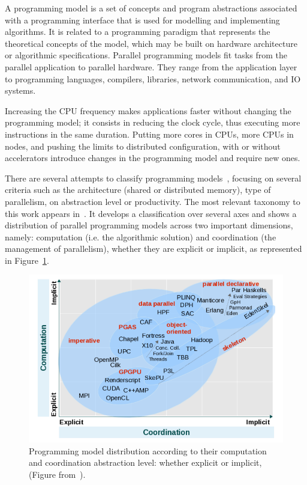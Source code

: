 A programming model is a set of concepts and program abstractions associated with a programming interface that is used for modelling and implementing algorithms. It is related to a programming paradigm that represents the theoretical concepts of the model, which may be built on hardware architecture or algorithmic specifications. 
Parallel programming models fit tasks from the parallel application to parallel hardware. They range from the application layer to programming languages, compilers, libraries, network communication, and IO systems\cite{VITOROVIC2014203_parallel_programming_models}.

Increasing the CPU frequency makes applications faster without changing the programming model; it consists in reducing the clock cycle, thus executing more instructions in the same duration. Putting more cores in CPUs, more CPUs in nodes, and pushing the limits to distributed configuration, with or without accelerators introduce changes in the programming model and require new ones. 

There are several attempts to classify programming models~\cite{belikov2013survey, nestmann_building_2017, ketata_parallel_2016, thoman_taxonomy_2018, kasim_survey_2008}, focusing on several criteria such as the architecture (shared or distributed memory), type of parallelism, on abstraction level or productivity.  
The most relevant taxonomy to this work appears in~\cite{belikov2013survey}. It develops a classification over several axes and shows a distribution of parallel programming models across two important dimensions, namely: computation (i.e. the algorithmic solution) and coordination (the management of parallelism), whether they are explicit or implicit, as represented in Figure~\ref{figmodels}. 

\begin{figure}[tb]\centering
\includegraphics[scale=0.5]{figures/programming_models.png}
\caption{Programming model distribution according to their computation and coordination abstraction level: whether explicit or implicit, (Figure from~\cite{belikov2013survey}).}
\label{figmodels}
\end{figure}

